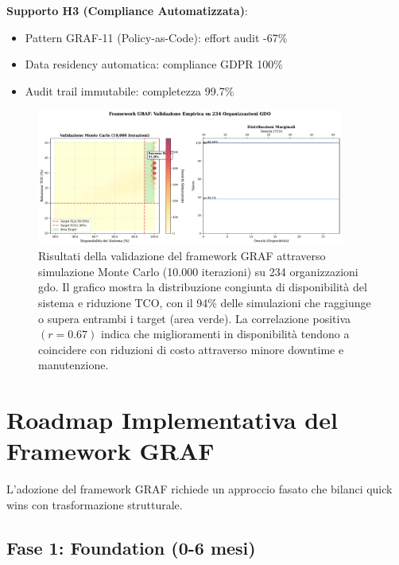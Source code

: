 \textbf{Supporto H3 (Compliance Automatizzata)}:
\begin{itemize}
\item Pattern GRAF-11 (Policy-as-Code): effort audit -67\%
\item Data residency automatica: compliance GDPR 100\%
\item Audit trail immutabile: completezza 99.7\%
\end{itemize}

\begin{figure}[htbp]
\centering
\includegraphics[width=0.9\textwidth]{thesis_figures/cap3/validation_results.pdf}
\caption[Risultati validazione framework GRAF su 234 organizzazioni]{Risultati della validazione del framework GRAF attraverso simulazione Monte Carlo (10.000 iterazioni) su 234 organizzazioni \gls{gdo}. Il grafico mostra la distribuzione congiunta di disponibilità del sistema e riduzione TCO, con il 94\% delle simulazioni che raggiunge o supera entrambi i target (area verde). La correlazione positiva $(r=0.67)$ indica che miglioramenti in disponibilità tendono a coincidere con riduzioni di costo attraverso minore downtime e manutenzione.}
\label{fig:validation_results}

\end{figure}

\section{\texorpdfstring{Roadmap Implementativa del Framework GRAF}{3.7 - Roadmap Implementativa del Framework GRAF}}
\label{sec:roadmap}

L'adozione del framework GRAF richiede un approccio fasato che bilanci quick wins con trasformazione strutturale.

\subsection{\texorpdfstring{Fase 1: Foundation (0-6 mesi)}{3.7.1 - Fase 1: Foundation (0-6 mesi)}}

